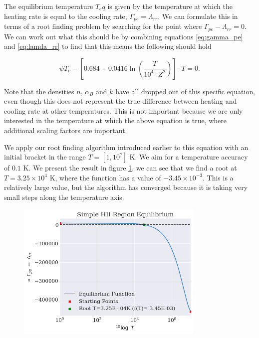 The equilibrium temperature $T_eq$ is given by the temperature at which the heating rate is equal to the cooling rate, $\Gamma_{pe} = \Lambda_{rr}$. We can formulate this in terms of a root finding problem by searching for the point where $\Gamma_{pe} - \Lambda_{rr} = 0$. We can work out what this should be by combining equations \ref{eq:gamma_pe} and \ref{eq:lamda_rr} to find that this means the following should hold

\begin{equation}
    \psi T_c - \left[0.684 - 0.0416\ln\left(\frac{T}{10^4\cdot Z^2}\right)\right] \cdot T = 0.
\end{equation}

Note that the densities $n$, $\alpha_B$ and $k$ have all dropped out of this specific equation, even though this does not represent the true difference between heating and cooling rate at other temperatures. This is not important because we are only interested in the temperature at which the above equation is true, where additional scaling factors are important.

We apply our root finding algorithm introduced earlier to this equation with an initial bracket in the range $T = \left[1, 10^7\right]$ K. We aim for a temperature accuracy of $0.1$ K. We present the result in figure \ref{fig:simple_roots}, we can see that we find a root at $T = 3.25 \times 10^4$ K, where the function has a value of $-3.45 \times 10^{-3}$. This is a relatively large value, but the algorithm has converged because it is taking very small steps along the temperature axis.

\begin{figure}
    \centering
    \includegraphics[width=0.8\textwidth]{results/simple_hiiregion_roots.png}
    \caption{}
    \label{fig:simple_roots}
\end{figure}


